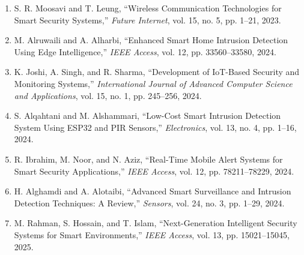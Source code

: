 \documentclass[12pt,a4paper,oneside]{report}
\begin{document}
\begin{enumerate}
\item \label{ref20} S. R. Moosavi and T. Leung, ``Wireless Communication Technologies for Smart Security Systems,'' \textit{Future Internet}, vol. 15, no. 5, pp. 1--21, 2023.

\item \label{ref21} M. Alruwaili and A. Alharbi, ``Enhanced Smart Home Intrusion Detection Using Edge Intelligence,'' \textit{IEEE Access}, vol. 12, pp. 33560--33580, 2024.

\item \label{ref22} K. Joshi, A. Singh, and R. Sharma, ``Development of IoT-Based Security and Monitoring Systems,'' \textit{International Journal of Advanced Computer Science and Applications}, vol. 15, no. 1, pp. 245--256, 2024.

\item \label{ref23} S. Alqahtani and M. Alshammari, ``Low-Cost Smart Intrusion Detection System Using ESP32 and PIR Sensors,'' \textit{Electronics}, vol. 13, no. 4, pp. 1--16, 2024.

\item \label{ref24} R. Ibrahim, M. Noor, and N. Aziz, ``Real-Time Mobile Alert Systems for Smart Security Applications,'' \textit{IEEE Access}, vol. 12, pp. 78211--78229, 2024.

\item \label{ref25} H. Alghamdi and A. Alotaibi, ``Advanced Smart Surveillance and Intrusion Detection Techniques: A Review,'' \textit{Sensors}, vol. 24, no. 3, pp. 1--29, 2024.

\item \label{ref26} M. Rahman, S. Hossain, and T. Islam, ``Next-Generation Intelligent Security Systems for Smart Environments,'' \textit{IEEE Access}, vol. 13, pp. 15021--15045, 2025.

\end{enumerate}
\end{document}
